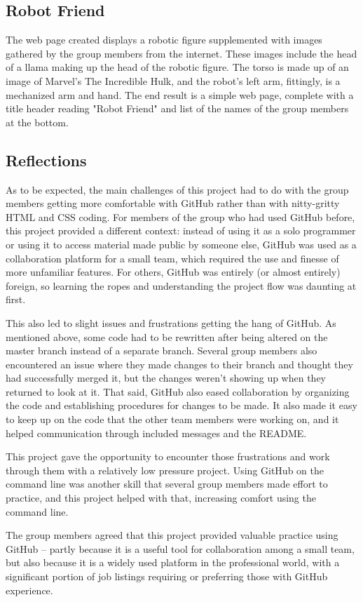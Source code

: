 \documentclass{article}
\begin{document}
\subsection*{Robot Friend}
The web page created displays a robotic figure supplemented with images gathered by the group members from the internet. These images include the head of a llama making up the head of the robotic figure. The torso is made up of an image of Marvel's The Incredible Hulk, and the robot's left arm, fittingly, is a mechanized arm and hand. The end result is a simple web page, complete with a title header reading "Robot Friend" and list of the names of the group members at the bottom. 
\subsection*{Reflections}
As to be expected, the main challenges of this project had to do with the group members getting more comfortable with GitHub rather than with nitty-gritty HTML and CSS coding. For members of the group who had used GitHub before, this project provided a different context: instead of using it as a solo programmer or using it to access material made public by someone else, GitHub was used as a collaboration platform for a small team, which required the use and finesse of more unfamiliar features. For others, GitHub was entirely (or almost entirely) foreign, so learning the ropes and understanding the project flow was daunting at first. 

This also led to slight issues and frustrations getting the hang of GitHub. As mentioned above, some code had to be rewritten after being altered on the master branch instead of a separate branch. Several group members also encountered an issue where they made changes to their branch and thought they had successfully merged it, but the changes weren't showing up when they returned to look at it. That said, GitHub also eased collaboration by organizing the code and establishing procedures for changes to be made. It also made it easy to keep up on the code that the other team members were working on, and it helped communication through included messages and the README. 

This project gave the opportunity to encounter those frustrations and work through them with a relatively low pressure project. Using GitHub on the command line was another skill that several group members made effort to practice, and this project helped with that, increasing comfort using the command line.

The group members agreed that this project provided valuable practice using GitHub -- partly because it is a useful tool for collaboration among a small team, but also because it is a widely used platform in the professional world, with a significant portion of job listings requiring or preferring those with GitHub experience. 
\end{document}
